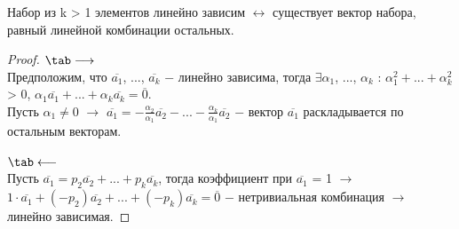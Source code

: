\begin{theorem}
	Набор из k > 1 элементов линейно зависим $\longleftrightarrow$ существует вектор набора, равный линейной комбинации остальных.
\end{theorem}
\begin{proof}
	$\tab\longrightarrow$\\
	Предположим, что $\overline{a_1}$, ..., $\overline{a_k}$ $-$ линейно зависима, тогда $\exists\alpha_1$, ..., $\alpha_k$ :  $\alpha_1^2+...+\alpha_k^2$ > 0, $\alpha_1\overline{a_1}+...+\alpha_k\overline{a_k}=\overline{0}$.\\
	Пусть $\alpha_1\neq0$ $\longrightarrow$ $\overline{a_1} = -\frac{\alpha_2}{\alpha_1}\overline{a_2}-...-\frac{\alpha_k}{\alpha_1}\overline{a_2}$ $-$ вектор $\overline{a_1}$ раскладывается по остальным векторам.
	
	$\tab\longleftarrow$\\
	Пусть $\overline{a_1} = p_2\overline{a_2}+...+p_k\overline{a_k}$, тогда коэффициент при $\overline{a_1}$ = 1 $\longrightarrow$ $1\cdot\overline{a_1}+(-p_2)\overline{a_2}+...+(-p_k)\overline{a_k}=\overline{0}$ $-$ нетривиальная комбинация $\longrightarrow$ линейно зависимая.
\end{proof}

